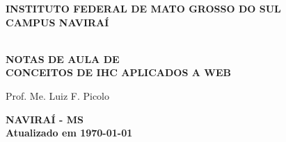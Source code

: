 \thispagestyle{empty}

\vfill
 \begin{center}
    
    {\large\bfseries INSTITUTO FEDERAL DE MATO GROSSO DO SUL} \\
    
    {\large\bfseries CAMPUS NAVIRAÍ}  \\ 

    \vspace*{1in}

    \vspace*{4cm}
    \noindent \\
    
    \large\bfseries{NOTAS DE AULA DE} \\
    \huge\bfseries{CONCEITOS DE IHC APLICADOS A WEB} \\
    
    \vspace*{4cm}
    
    \large{Prof. Me. Luiz F. Picolo}
    
    \vfill
    \large\bfseries{NAVIRAÍ - MS} \\ 
    \vspace{0.2cm}
    \small Atualizado em \today
\end{center}

\normalsize


